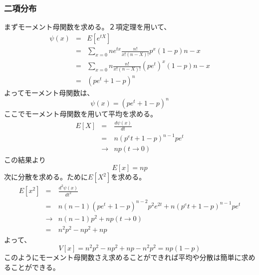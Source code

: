 \documentclass[a4paper,10pt]{jarticle}
\begin{document}
\subsubsection{二項分布}
まずモーメント母関数を求める。２項定理を用いて、
\begin{eqnarray*}
    \psi(x) &=& E[e^{tX}]\\
    &=& \sum_{x=0}{n} e^{tx}\frac{n!}{x!(n-X)!}p^x(1-p)n-x\\
    &=&\sum_{x=0}{n} \frac{n!}{x!(n-X)!}(pe^t)^x(1-p)n-x\\
    &=& (pe^t + 1 - p)^n
\end{eqnarray*}
よってモーメント母関数は、
\begin{equation}
    \psi(x) =(pe^t + 1 - p)^n\tag{3,40}
\end{equation}
ここでモーメント母関数を用いて平均を求める。
\begin{eqnarray*}
    E[X] &=& \frac{d\psi(x)}{dt}\\
    &=& n(p^et + 1 -p)^{n-1}pe^t\\
    &\rightarrow& np(t\rightarrow 0)
\end{eqnarray*}
この結果より
\begin{equation}
    E[x] = np \tag{3,41}
\end{equation}
次に分散を求める。ために$E[X^2]$を求める。
\begin{eqnarray*}
    E[x^2] &=& \frac{d^2\psi(x)}{dt^2}\\
           &=& n(n-1)(pe^t+1-p)^{n-2}p^2e^{2t}+n(p^et + 1 -p)^{n-1}pe^t\\
           &\rightarrow& n(n-1)p^2+np(t\rightarrow 0)\\
           &=& n^2p^2-np^2+np
\end{eqnarray*}
よって、
\begin{equation}
    V[x]= n^2p^2-np^2+np -n^2p^2=np(1-p)\tag{3,42}
\end{equation}
このようにモーメント母関数さえ求めることができれば平均や分散は簡単に求めることができる。
\end{document}
